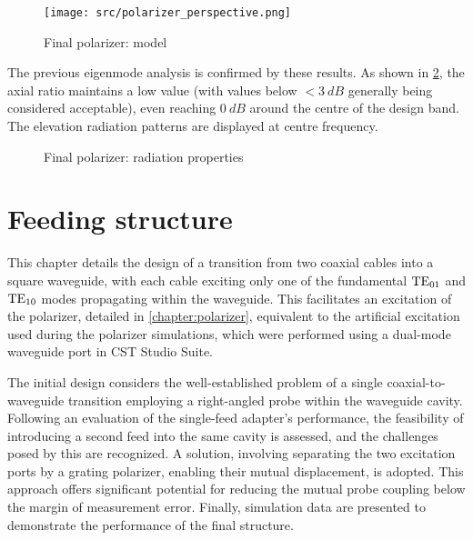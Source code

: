 \documentclass[11pt,a4paper,twoside,openany]{report}
\begin{document}
\begin{figure}[!ht]
    \centering
    \texttt{[image: src/polarizer\_perspective.png]}
    \caption{\label{fig:polarizer-perspective}Final polarizer: model}
\end{figure}

The previous eigenmode analysis is confirmed by these results. As shown in \cref{fig:polarizer-radiation}, the axial ratio maintains a low value (with values below $<\qty{3}{dB}$ generally being considered acceptable), even reaching $\qty{0}{dB}$ around the centre of the design band. The elevation radiation patterns are displayed at centre frequency.

\begin{figure}[!ht]
    \centering
    
    \caption{\label{fig:polarizer-radiation}Final polarizer: radiation properties}
\end{figure}

\chapter{Feeding structure}
\label{chapter:feeding-structure}
This chapter details the design of a transition from two coaxial cables into a square waveguide, with each cable exciting only one of the fundamental $\text{TE}_{01}$ and $\text{TE}_{10}$ modes propagating within the waveguide. This facilitates an excitation of the polarizer, detailed in \cref{chapter:polarizer}, equivalent to the artificial excitation used during the polarizer simulations, which were performed using a dual-mode waveguide port in CST Studio Suite.

The initial design considers the well-established problem of a single coaxial-to-waveguide transition employing a right-angled probe within the waveguide cavity. Following an evaluation of the single-feed adapter's performance, the feasibility of introducing a second feed into the same cavity is assessed, and the challenges posed by this are recognized. A solution, involving separating the two excitation ports by a grating polarizer, enabling their mutual displacement, is adopted. This approach offers significant potential for reducing the mutual probe coupling below the margin of measurement error. Finally, simulation data are presented to demonstrate the performance of the final structure.
\end{document}
